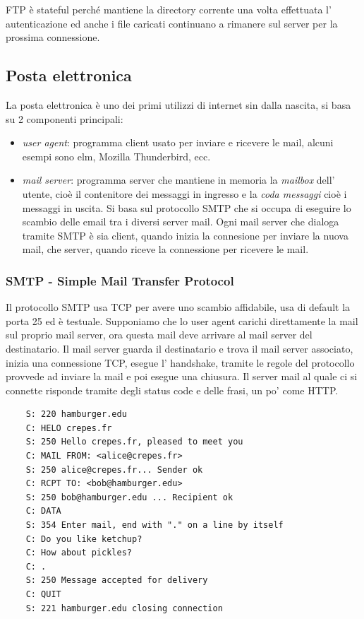 FTP è stateful perché mantiene la directory corrente una volta effettuata l' autenticazione ed anche i file caricati continuano a rimanere sul server per la prossima connessione.

\subsection{Posta elettronica}
La posta elettronica è uno dei primi utilizzi di internet sin dalla nascita, si basa su 2 componenti principali:
\begin{itemize}
    \item \emph{user agent}: programma client usato per inviare e ricevere le mail, alcuni esempi sono elm, Mozilla Thunderbird, ecc.
    
    \item \emph{mail server}: programma server che mantiene in memoria la \emph{mailbox} dell' utente, cioè il contenitore dei messaggi in ingresso e la \emph{coda messaggi} cioè i messaggi in uscita.
    Si basa sul protocollo SMTP che si occupa di eseguire lo scambio delle email tra i diversi server mail.
    Ogni mail server che dialoga tramite SMTP è sia client, quando inizia la connesione per inviare la nuova mail, che server, quando riceve la connessione per ricevere le mail.
\end{itemize}

\subsubsection{SMTP - Simple Mail Transfer Protocol}
Il protocollo SMTP usa TCP per avere uno scambio affidabile, usa di default la porta 25 ed è testuale.
Supponiamo che lo user agent carichi direttamente la mail sul proprio mail server, ora questa mail deve arrivare al mail server del destinatario.
Il mail server guarda il destinatario e trova il mail server associato, inizia una connessione TCP, esegue l' handshake, tramite le regole del protocollo provvede ad inviare la mail e poi esegue una chiusura.
Il server mail al quale ci si connette risponde tramite degli status code e delle frasi, un po' come HTTP.
\begin{verbatim}
    S: 220 hamburger.edu
    C: HELO crepes.fr
    S: 250 Hello crepes.fr, pleased to meet you
    C: MAIL FROM: <alice@crepes.fr>
    S: 250 alice@crepes.fr... Sender ok
    C: RCPT TO: <bob@hamburger.edu>
    S: 250 bob@hamburger.edu ... Recipient ok
    C: DATA
    S: 354 Enter mail, end with "." on a line by itself
    C: Do you like ketchup?
    C: How about pickles?
    C: .
    S: 250 Message accepted for delivery
    C: QUIT
    S: 221 hamburger.edu closing connection
\end{verbatim}

